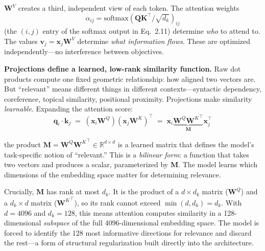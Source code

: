 $\mathbf{W}^V$ creates a third, independent view of each token. The attention weights
\[
\alpha_{ij} = \text{softmax}\!\left(\mathbf{Q}\mathbf{K}^\top / \sqrt{d_k}\right)_{ij}
\]
(the $(i,j)$ entry of the softmax output in Eq.~2.11) determine \emph{who} to attend to. The values $\mathbf{v}_j = \mathbf{x}_j \mathbf{W}^V$ determine \emph{what information flows}. These are optimized independently---no interference between objectives.

\textbf{Projections define a learned, low-rank similarity function.}\hspace{1em} Raw dot products compute one fixed geometric relationship: how aligned two vectors are. But ``relevant'' means different things in different contexts---syntactic dependency, coreference, topical similarity, positional proximity. Projections make similarity \emph{learnable}. Expanding the attention score:
\begin{equation}
\mathbf{q}_i \cdot \mathbf{k}_j \;=\; (\mathbf{x}_i \mathbf{W}^Q)(\mathbf{x}_j \mathbf{W}^K)^\top \;=\; \mathbf{x}_i \underbrace{\mathbf{W}^Q {\mathbf{W}^K}^\top}_{\mathbf{M}} \mathbf{x}_j^\top
\end{equation}

%
the product $\mathbf{M} = \mathbf{W}^Q {\mathbf{W}^K}^\top \in \mathbb{R}^{d \times d}$ is a learned matrix that defines the model's task-specific notion of ``relevant.'' This is a \emph{bilinear form}: a function that takes two vectors and produces a scalar, parameterized by $\mathbf{M}$. The model learns which dimensions of the embedding space matter for determining relevance.

Crucially, $\mathbf{M}$ has rank at most $d_k$. It is the product of a $d \times d_k$ matrix ($\mathbf{W}^Q$) and a $d_k \times d$ matrix (${\mathbf{W}^K}^\top$), so its rank cannot exceed $\min(d, d_k) = d_k$. With $d = 4096$ and $d_k = 128$, this means attention computes similarity in a 128-dimensional \emph{subspace} of the full 4096-dimensional embedding space. The model is forced to identify the 128 most informative directions for relevance and discard the rest---a form of structural regularization built directly into the architecture.

